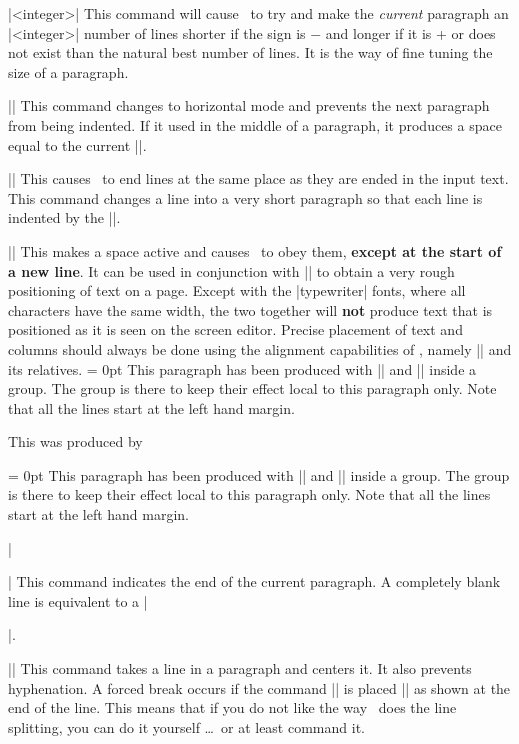 \leftskip=0pt \rightskip=0pt

\mbr
\pri\@|\looseness [=] [+ -] <integer>|
\nbr
This command will cause \tex\ to try and make the {\it current} paragraph
an |<integer>| number of lines shorter if the sign is $-$ and longer if it is +
or does not exist than the natural best number of lines. It is the way of
fine tuning the size of a paragraph.

\mbr
\pri\@|\noindent|
\nbr
This command changes to horizontal mode and prevents the next paragraph from
being indented. If it used in the middle of a paragraph, it produces a space
equal to the current |\parindent|. 

\mbr
\pla\@|\obeylines|
\nbr
This causes \tex\ to end lines at the same place as they are ended in the
input text. This command changes a line into a very short paragraph
so that each line is  indented by the |\parindent|. 

\mbr
\pla\@|\obeyspaces|
\nbr
This makes a space active and causes \tex\ to obey them, {\bf except at the
start of a new line}. It can be used in conjunction with |\obeylines| to
obtain a very rough positioning of text on a page. Except with the
|typewriter| fonts, where all characters have the same width, the two
together will {\bf not} produce text that is positioned as it is seen on the
screen editor. Precise placement of text and columns should always be done
using the alignment capabilities of \tex, namely |\halign| and its relatives.
\sbr
{\obeylines \obeyspaces \parskip = 0pt
This paragraph
has     been produced  with |\obeylines|
and |\obeyspaces| inside a group. The 
group    is there to keep their effect local to this
paragraph
only. Note that all the lines 
start at the left hand margin.}

This was produced by

\begintt
{\obeylines \obeyspaces \parskip = 0pt
This paragraph
     has     been produced  with |\obeylines|
 and |\obeyspaces| inside a group. The 
group    is there to keep their effect local to this
paragraph
only. Note that all the lines 
start at the left hand margin.}
\endtt


\mbr
\pri\@|\par|
\nbr
This command indicates the end of the current paragraph. A completely blank
line is equivalent to a |\par|.

\mbr
\ext\@|\paragraphcenterline|
\nbr
\begingroup \paragraphcenterline
This command takes a line in a paragraph and centers it. It also prevents
hyphenation. A forced break occurs if the command |\cr| \cr is placed
|\cr| \cr as shown at the end of the line. This means that if you do not like
the way \intex\ does the line splitting, you can do it yourself \dots\ or at
least command it.
\endgroup


